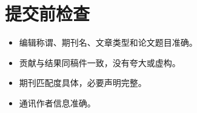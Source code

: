 \documentclass[UTF8,11pt]{ctexart}
\newcommand{\checkbox}{\ensuremath{\square}}
\begin{document}
\section{提交前检查}
\begin{itemize}
\item[\checkbox] 编辑称谓、期刊名、文章类型和论文题目准确。
\item[\checkbox] 贡献与结果同稿件一致，没有夸大或虚构。
\item[\checkbox] 期刊匹配度具体，必要声明完整。
\item[\checkbox] 通讯作者信息准确。
\end{itemize}
\end{document}
